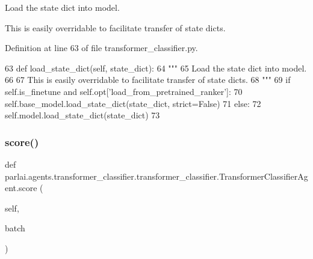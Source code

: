\begin{DoxyVerb}Load the state dict into model.

This is easily overridable to facilitate transfer of state dicts.
\end{DoxyVerb}
 

Definition at line 63 of file transformer\+\_\+classifier.\+py.


\begin{DoxyCode}
63     \textcolor{keyword}{def }load\_state\_dict(self, state\_dict):
64         \textcolor{stringliteral}{"""}
65 \textcolor{stringliteral}{        Load the state dict into model.}
66 \textcolor{stringliteral}{}
67 \textcolor{stringliteral}{        This is easily overridable to facilitate transfer of state dicts.}
68 \textcolor{stringliteral}{        """}
69         \textcolor{keywordflow}{if} self.is\_finetune \textcolor{keywordflow}{and} self.opt[\textcolor{stringliteral}{'load\_from\_pretrained\_ranker'}]:
70             self.base\_model.load\_state\_dict(state\_dict, strict=\textcolor{keyword}{False})
71         \textcolor{keywordflow}{else}:
72             self.model.load\_state\_dict(state\_dict)
73 \end{DoxyCode}
\mbox{\label{classparlai_1_1agents_1_1transformer__classifier_1_1transformer__classifier_1_1TransformerClassifierAgent_a8d3cb4862ab598c8f93239255dd65eeb}} 
\subsubsection{\texorpdfstring{score()}{score()}}
{\footnotesize\ttfamily def parlai.\+agents.\+transformer\+\_\+classifier.\+transformer\+\_\+classifier.\+Transformer\+Classifier\+Agent.\+score (\begin{DoxyParamCaption}\item[{}]{self,  }\item[{}]{batch }\end{DoxyParamCaption})}



